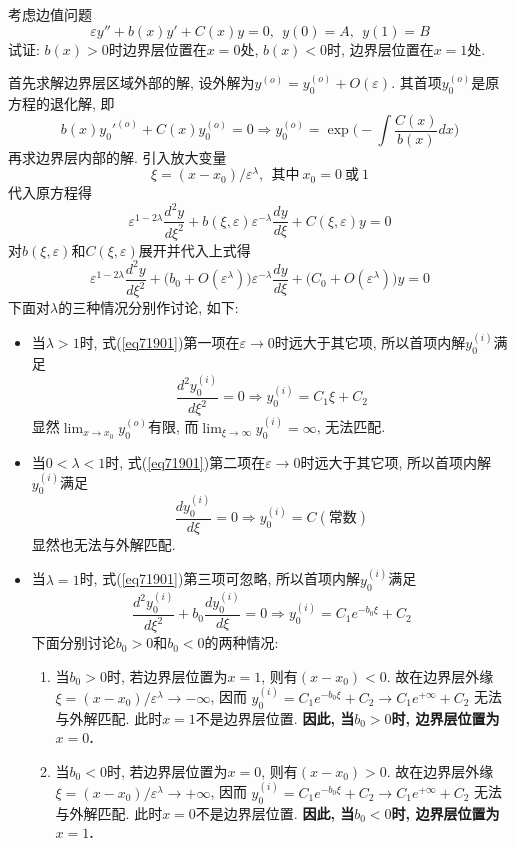 \begin{problem}[习题7.19]
考虑边值问题
\[
\varepsilon y'' + b(x)y'+C(x)y = 0,~~ y(0)=A, ~~ y(1)=B
\]
试证: $b(x)>0$时边界层位置在$x=0$处, $b(x)<0$时, 边界层位置在$x=1$处.
\end{problem}

\begin{solution}
首先求解边界层区域外部的解, 设外解为$y^{(o)} = y_0^{(o)} + O(\varepsilon)$. 其首项$y_0^{(o)}$是原方程的退化解, 即
\[
b(x) y_0'^{(o)} + C(x)y_0^{(o)} = 0
\Longrightarrow
y_0^{(o)} = \exp\Big(
-\int\frac{C(x)}{b(x)}dx
\Big)
\]
再求边界层内部的解. 引入放大变量
\[
\xi = (x-x_0)/\varepsilon^\lambda, ~~\textrm{其中}~ x_0 = 0~\textrm{或}~1
\]
代入原方程得
\[
\varepsilon^{1-2\lambda}\frac{d^2y}{d\xi^2} + b(\xi,\varepsilon)\varepsilon^{-\lambda}\frac{dy}{d\xi}+C(\xi,\varepsilon)y = 0
\]
对$b(\xi,\varepsilon)$和$C(\xi,\varepsilon)$展开并代入上式得
\begin{equation}\label{eq71901}
\varepsilon^{1-2\lambda}\frac{d^2y}{d\xi^2} + \big(b_0+O(\varepsilon^\lambda)\big)\varepsilon^{-\lambda}\frac{dy}{d\xi}+\big(C_0+O(\varepsilon^\lambda)\big)y = 0
\end{equation}
下面对$\lambda$的三种情况分别作讨论, 如下:
\begin{itemize}
\item 当$\lambda > 1$时, 式(\ref{eq71901})第一项在$\varepsilon\rightarrow 0$时远大于其它项, 所以首项内解$y_0^{(i)}$满足
\[
\frac{d^2y_0^{(i)}}{d\xi^2}  = 0 \Longrightarrow y_0^{(i)} = C_1\xi + C_2
\]
显然$\lim_{x\rightarrow x_0}y_0^{(o)}$有限, 而$\lim_{\xi\rightarrow\infty} y_0^{(i)}=\infty$, 无法匹配.
\item 当$0 < \lambda < 1$时,  式(\ref{eq71901})第二项在$\varepsilon\rightarrow 0$时远大于其它项, 所以首项内解$y_0^{(i)}$满足
    \[
   \frac{dy_0^{(i)}}{d\xi} = 0  \Longrightarrow y_0^{(i)} = C(\textrm{常数})
    \]
    显然也无法与外解匹配.
\item 当$\lambda = 1$时, 式(\ref{eq71901})第三项可忽略, 所以首项内解$y_0^{(i)}$满足
\[
\frac{d^2y_0^{(i)}}{d\xi^2} + b_0\frac{dy_0^{(i)}}{d\xi} = 0 \Longrightarrow  y_0^{(i)} = C_1 e^{-b_0\xi} + C_2
\]
下面分别讨论$b_0>0$和$b_0<0$的两种情况:
\begin{enumerate}
\item 当$b_0>0$时, 若边界层位置为$x=1$, 则有$(x-x_0)<0$. 故在边界层外缘$\xi = (x-x_0)/\varepsilon^\lambda \rightarrow -\infty$, 因而 $y_0^{(i)} = C_1 e^{-b_0\xi} + C_2 \rightarrow C_1 e^{+\infty}+ C_2$ 无法与外解匹配. 此时$x=1$不是边界层位置. \textbf{因此, 当$b_0>0$时, 边界层位置为$x=0$.}
\item 当$b_0<0$时, 若边界层位置为$x=0$, 则有$(x-x_0)>0$. 故在边界层外缘$\xi = (x-x_0)/\varepsilon^\lambda \rightarrow +\infty$, 因而 $y_0^{(i)} = C_1 e^{-b_0\xi} + C_2 \rightarrow C_1 e^{+\infty}+ C_2$ 无法与外解匹配. 此时$x=0$不是边界层位置. \textbf{因此, 当$b_0<0$时, 边界层位置为$x=1$.}
\end{enumerate}
\end{itemize}
\end{solution} 

